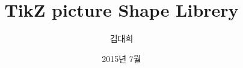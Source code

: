 \documentclass[ aspectratio=169,  10pt,blue,xcolor=pdftex,dvipsnames,table,handout,notes]{beamer}
\begin{document}
	

			\title{TikZ picture Shape Librery}
			\author{김대희}
			\date{2015년 7월}



		\begin{frame}[plain]
		\titlepage
		\note[item]{}
		\end{frame}


























\end{document}
